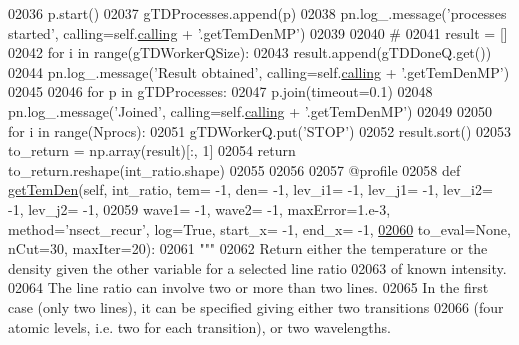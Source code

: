 \begin{DoxyCode}
{{02036             p.start()
02037             gTDProcesses.append(p)
02038         pn.log\_.message(\textcolor{stringliteral}{'processes started'}, calling=self.\hyperlink{classpyneb_1_1core_1_1pynebcore_1_1_atom_a373b7735acf4f528b54bddf373ad67a1}{calling} + \textcolor{stringliteral}{'.getTemDenMP'})
02039 
02040         \textcolor{comment}{#}
02041         result = []
02042         \textcolor{keywordflow}{for} i \textcolor{keywordflow}{in} range(gTDWorkerQSize):
02043             result.append(gTDDoneQ.get())
02044         pn.log\_.message(\textcolor{stringliteral}{'Result obtained'}, calling=self.\hyperlink{classpyneb_1_1core_1_1pynebcore_1_1_atom_a373b7735acf4f528b54bddf373ad67a1}{calling} + \textcolor{stringliteral}{'.getTemDenMP'})
02045 
02046         \textcolor{keywordflow}{for} p \textcolor{keywordflow}{in} gTDProcesses:
02047             p.join(timeout=0.1)
02048         pn.log\_.message(\textcolor{stringliteral}{'Joined'}, calling=self.\hyperlink{classpyneb_1_1core_1_1pynebcore_1_1_atom_a373b7735acf4f528b54bddf373ad67a1}{calling} + \textcolor{stringliteral}{'.getTemDenMP'})
02049 
02050         \textcolor{keywordflow}{for} i \textcolor{keywordflow}{in} range(Nprocs):
02051             gTDWorkerQ.put(\textcolor{stringliteral}{'STOP'})
02052         result.sort()
02053         to\_return = np.array(result)[:, 1]
02054         \textcolor{keywordflow}{return} to\_return.reshape(int\_ratio.shape)
02055 
02056     
02057     @profile
02058     \textcolor{keyword}{def }\hyperlink{classpyneb_1_1core_1_1pynebcore_1_1_atom_a5e1aa59c92bf62bae8bd756a4405eb25}{getTemDen}(self, int\_ratio, tem= -1, den= -1, lev\_i1= -1, lev\_j1= -1, lev\_i2= -1, lev\_j2= 
      -1,
02059                   wave1= -1, wave2= -1, maxError=1.e-3, method=\textcolor{stringliteral}{'nsect\_recur'}, log=\textcolor{keyword}{True}, start\_x= -1, end\_x=
       -1,
\hypertarget{pynebcore_8py_source_l02060}{}\hyperlink{classpyneb_1_1core_1_1pynebcore_1_1_atom_a5e1aa59c92bf62bae8bd756a4405eb25}{02060}                   to\_eval=\textcolor{keywordtype}{None}, nCut=30, maxIter=20):
02061         \textcolor{stringliteral}{"""}
02062 \textcolor{stringliteral}{        Return either the temperature or the density given the other variable for a selected line ratio }
02063 \textcolor{stringliteral}{            of known intensity.}
02064 \textcolor{stringliteral}{        The line ratio can involve two or more than two lines. }
02065 \textcolor{stringliteral}{        In the first case (only two lines), it can be specified giving either two transitions }
02066 \textcolor{stringliteral}{            (four atomic levels, i.e. two for each transition), or two wavelengths.}
}}
\end{DoxyCode}
